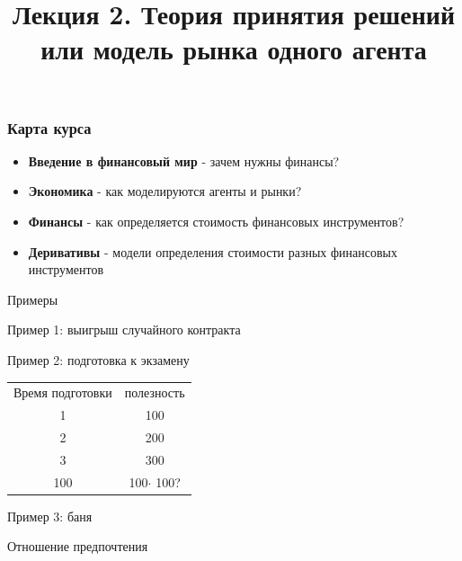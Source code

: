 \documentclass{beamer}
\title[Функция полезности]{Лекция 2. Теория принятия решений или модель рынка одного агента} %
\begin{document}
\begin{frame}
\titlepage 
\end{frame}

\begin{frame}
\frametitle{Карта курса} 

\begin{itemize} 
    \item \textbf{Введение в финансовый мир} - зачем нужны финансы? 
    \item \textbf{Экономика} - как моделируются агенты и рынки?
    \item \textbf{Финансы} - как определяется стоимость финансовых инструментов? 
    \item \textbf{Деривативы} - модели определения стоимости разных финансовых инструментов

\end{itemize}
\end{frame}

\begin{frame}
  \centering
\Large Примеры
\end{frame}

\begin{frame}{Пример 1: выигрыш случайного контракта}
    
\end{frame}


\begin{frame}{Пример 2: подготовка к экзамену}
\begin{table}
    \centering
    \begin{tabular}{cc}
        Время подготовки & полезность\\
        1 & 100\\
        2 & 200\\
        3 & 300 \\
        100 & 100$\cdot$ 100? \\
    \end{tabular}
    \label{tab:my_label}
\end{table}
\end{frame}

\begin{frame}{Пример 3: баня}

\end{frame}

\begin{frame}
  \centering
\Large Отношение предпочтения
\end{frame}
\end{document}
